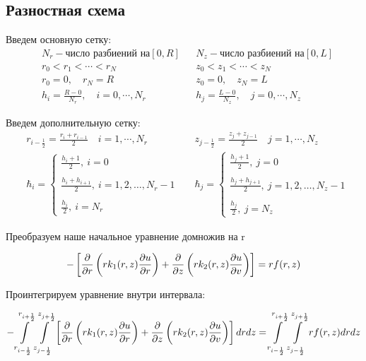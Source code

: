 \subsection{Разностная схема}
Введем основную сетку:
\begin{align*}
  &N_r - \text{число разбиений на} [0, R] & &N_z - \text{число разбиений на} [0, L] \\
  &r_0 < r_1 < \cdots < r_N & &z_0 < z_1 < \cdots < z_N \\
  &r_0 = 0,\quad r_N = R & &z_0 = 0,\quad z_N = L \\
  &h_i = \frac{R - 0}{N_r},\quad i=0,\cdots, N_r & &h_j = \frac{L - 0}{N_z},\quad j=0,\cdots, N_z 
\end{align*}

Введем дополнительную сетку:
\begin{align*}
  &r_{i-\frac{1}{2}} = \frac{r_i + r_{i - 1}}{2}\quad i=1,\cdots, N_r & &z_{j-\frac{1}{2}} = \frac{z_j + z_{j - 1}}{2}\quad j=1,\cdots, N_z \\
  & \hbar_i = \begin{cases}
    \frac{h_i + 1}{2},\ i = 0 \\ \\
    \frac{h_i + h_{i+1}}{2},\ i = 1, 2, \dots, N_r-1 \\ \\
    \frac{h_i}{2},\ i = N_r
  \end{cases} &
  & \hbar_j = \begin{cases}
    \frac{h_j + 1}{2},\ j = 0 \\ \\
    \frac{h_j + h_{j+1}}{2},\ j = 1, 2, \dots, N_z-1 \\ \\
    \frac{h_j}{2},\ j = N_z
  \end{cases}
\end{align*}

Преобразуем наше начальное уравнение домножив на r

\[
  - \left [ \pdv{}{r} \left ( r k_1(r, z) \pdv{u}{r} \right ) 
  + \pdv{}{z} \left ( rk_2(r, z)\pdv{u}{v} \right ) \right ] = rf(r, z)
\]

Проинтегрируем уравнение внутри интервала:

\[
  - \int\limits^{r_{i +\frac{1}{2}}}_{r_{i -\frac{1}{2}}} \int\limits^{z_{j +\frac{1}{2}}}_{z_{j -\frac{1}{2}}} \left [ \pdv{}{r} \left ( r k_1(r, z) \pdv{u}{r} \right ) 
  + \pdv{}{z} \left ( rk_2(r, z)\pdv{u}{v} \right ) \right ] dr dz = \int\limits^{r_{i +\frac{1}{2}}}_{r_{i -\frac{1}{2}}} \int\limits^{z_{j +\frac{1}{2}}}_{z_{j -\frac{1}{2}}} rf(r, z) dr dz
\]

